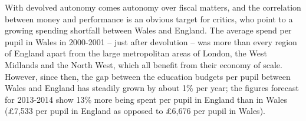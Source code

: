 \documentclass{sig-alternate}
\begin{document}
With devolved autonomy comes autonomy over fiscal matters,
and the correlation between money and performance is
an obvious target for critics, who point to a growing spending shortfall 
between Wales and England.
The average spend per pupil in Wales in 2000-2001
-- just after devolution --
was more than every region of England apart from
the large metropolitan areas of London, the West Midlands and the North West,
which all benefit from their economy of scale.
However, since then, the gap between
the education budgets per pupil between Wales and England
has steadily grown by about 1\% per year;
the figures forecast for 2013-2014 show
13\% more being spent per pupil in England than in Wales
(\pounds7,533 per pupil in England as opposed to
\pounds6,676 per pupil in Wales).




\end{document}
